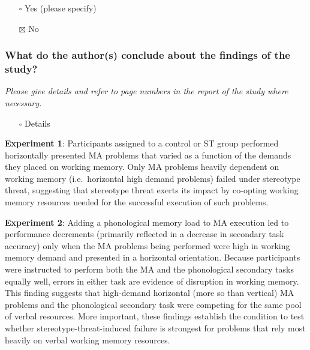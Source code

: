\documentclass[
  doc, a4paper]{apa7}
\providecommand{\tightlist}{%
  \setlength{\itemsep}{0pt}\setlength{\parskip}{0pt}}
\begin{document}
\begin{itemize}
\tightlist
\item[$\square$]
  Yes (please specify)
\item[$\boxtimes$]
  No
\end{itemize}

\subsubsection{What do the author(s) conclude about the findings of the study?}\label{what-do-the-authors-conclude-about-the-findings-of-the-study}

\emph{Please give details and refer to page numbers in the report of the study where necessary.}

\begin{itemize}
\tightlist
\item[$\square$]
  Details
\end{itemize}

\textbf{Experiment 1}:
Participants assigned to a control or ST group performed horizontally presented MA problems that varied as a function of the demands they placed on working memory. Only MA problems heavily dependent on working memory (i.e.~horizontal high demand problems) failed under stereotype threat, suggesting that stereotype threat exerts its impact by co-opting working memory resources needed for the successful execution of such problems.

\textbf{Experiment 2}:
Adding a phonological memory load to MA execution led to performance decrements (primarily reflected in a decrease in secondary task accuracy) only when the MA problems being performed were high in working memory demand and presented in a horizontal orientation. Because participants were instructed to perform both the MA and the phonological secondary tasks equally well, errors in either task are evidence of disruption in working memory.\\
This finding suggests that high-demand horizontal (more so than vertical) MA problems and the phonological secondary task were competing for the same pool of verbal resources. More important, these findings establish the condition to test whether stereotype-threat-induced failure is strongest for problems that rely most heavily on verbal working memory resources.
\end{document}
